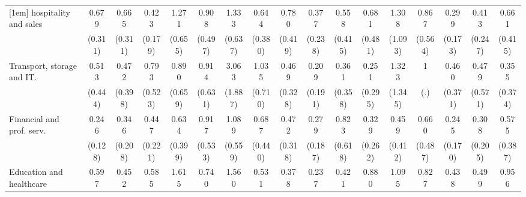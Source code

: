 {\begin{tabular}{l*{16}{c}}
[1em]
hospitality and sales&       0.679         &       0.665         &       0.423\sym{*}  &       1.271         &       0.908         &       1.333         &       0.644         &       0.780         &       0.377         &       0.558         &       0.681         &       1.308         &       0.867         &       0.299\sym{*}  &       0.413         &       0.661         \\
                    &     (0.311)         &     (0.311)         &     (0.179)         &     (0.655)         &     (0.497)         &     (0.637)         &     (0.380)         &     (0.419)         &     (0.238)         &     (0.415)         &     (0.481)         &     (1.093)         &     (0.564)         &     (0.173)         &     (0.247)         &     (0.415)         \\
[1em]
Transport, storage and IT.&       0.513         &       0.472         &       0.793         &       0.890         &       0.914         &       3.063         &       1.035         &       0.469         &       0.209         &       0.361         &       0.251         &       1.323         &           1         &       0.460         &       0.479         &       0.355         \\
                    &     (0.444)         &     (0.398)         &     (0.523)         &     (0.659)         &     (0.631)         &     (1.887)         &     (0.710)         &     (0.328)         &     (0.191)         &     (0.358)         &     (0.295)         &     (1.345)         &         (.)         &     (0.371)         &     (0.571)         &     (0.374)         \\
[1em]
Financial and prof. serv.&       0.246\sym{**} &       0.346         &       0.447         &       0.634         &       0.917         &       1.089         &       0.687         &       0.472         &       0.279         &       0.823         &       0.329         &       0.459         &       0.660         &       0.245\sym{*}  &       0.308         &       0.575         \\
                    &     (0.128)         &     (0.208)         &     (0.221)         &     (0.399)         &     (0.533)         &     (0.559)         &     (0.440)         &     (0.318)         &     (0.187)         &     (0.618)         &     (0.262)         &     (0.412)         &     (0.487)         &     (0.170)         &     (0.205)         &     (0.387)         \\
[1em]
Education and healthcare&       0.597         &       0.452         &       0.585         &       1.615         &       0.740         &       1.560         &       0.531         &       0.378         &       0.237\sym{*}  &       0.421         &       0.880         &       1.095         &       0.827         &       0.438         &       0.499         &       0.956         \\

\end{tabular}}
